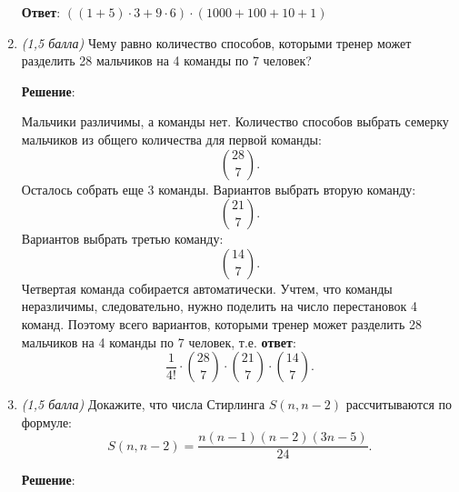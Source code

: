 \documentclass{article}
\begin{document}
\begin{enumerate}
    \textbf{Ответ}:
    $((1 + 5) \cdot 3 + 9 \cdot 6) \cdot (1000 + 100 + 10 + 1)$

    
    \item \textit{(1,5 балла)} Чему равно количество способов, которыми тренер может разделить 28 мальчиков на 4 команды по 7 человек?
    
    \textbf{Решение}:

    Мальчики различимы, а команды нет. Количество способов выбрать семерку мальчиков из общего количества для первой команды:
    \begin{equation}
        \binom{28}{7}.
    \end{equation}
    Осталось собрать еще 3 команды. Вариантов выбрать вторую команду:
    \begin{equation}
        \binom{21}{7}.
    \end{equation}
    Вариантов выбрать третью команду:
    \begin{equation}
        \binom{14}{7}.
    \end{equation}
    Четвертая команда собирается автоматически. Учтем, что команды неразличимы, следовательно, нужно поделить на число перестановок 4 команд. Поэтому всего вариантов, которыми тренер может разделить 28 мальчиков на 4 команды по 7 человек, т.е. \textbf{ответ}:
    \begin{equation}
        \frac{1}{4!} \cdot  \binom{28}{7} \cdot \binom{21}{7} \cdot \binom{14}{7}.
    \end{equation}
   
    \item \textit{(1,5 балла)} Докажите, что числа Стирлинга $S(n,n-2)$ рассчитываются по формуле:
    $$S(n,n-2)=\frac{n(n-1)(n-2)(3n-5)}{24}.$$

    \textbf{Решение}:


\end{enumerate}
\end{document}
